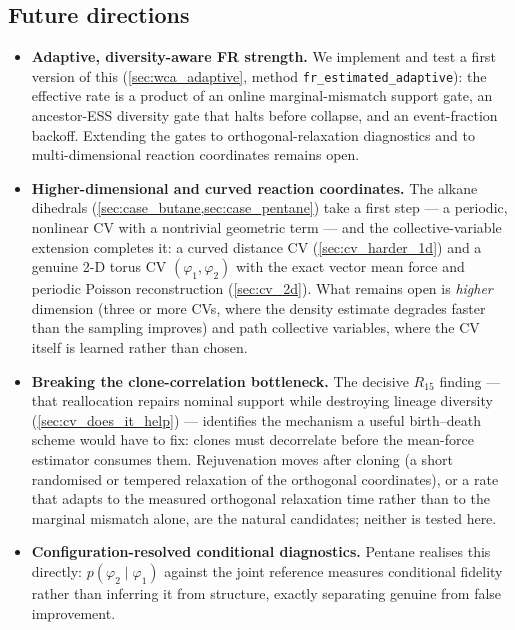 \subsection{Future directions}
\begin{itemize}
  \item \textbf{Adaptive, diversity-aware FR strength.} We implement and test a
        first version of this (\cref{sec:wca_adaptive}, method
        \texttt{fr\_estimated\_adaptive}): the effective rate is a product of an
        online marginal-mismatch support gate, an ancestor-ESS diversity gate that
        halts before collapse, and an event-fraction backoff. Extending the gates
        to orthogonal-relaxation diagnostics and to multi-dimensional reaction
        coordinates remains open.
  \item \textbf{Higher-dimensional and curved reaction coordinates.} The alkane
        dihedrals (\cref{sec:case_butane,sec:case_pentane}) take a first step ---
        a periodic, nonlinear CV with a nontrivial geometric term --- and the
        collective-variable extension completes it: a curved distance CV
        (\cref{sec:cv_harder_1d}) and a genuine 2-D torus CV $(\varphi_1,\varphi_2)$
        with the exact vector mean force and periodic Poisson reconstruction
        (\cref{sec:cv_2d}). What remains open is \emph{higher} dimension (three or more
        CVs, where the density estimate degrades faster than the sampling improves) and
        path collective variables, where the CV itself is learned rather than chosen.
  \item \textbf{Breaking the clone-correlation bottleneck.} The decisive $R_{15}$
        finding --- that reallocation repairs nominal support while destroying lineage
        diversity (\cref{sec:cv_does_it_help}) --- identifies the mechanism a useful
        birth--death scheme would have to fix: clones must decorrelate before the
        mean-force estimator consumes them. Rejuvenation moves after cloning (a short
        randomised or tempered relaxation of the orthogonal coordinates), or a rate that
        adapts to the measured orthogonal relaxation time rather than to the marginal
        mismatch alone, are the natural candidates; neither is tested here.
  \item \textbf{Configuration-resolved conditional diagnostics.} Pentane realises
        this directly: $p(\varphi_2\mid\varphi_1)$ against the joint reference
        measures conditional fidelity rather than inferring it from structure,
        exactly separating genuine from false improvement.

\end{itemize}
